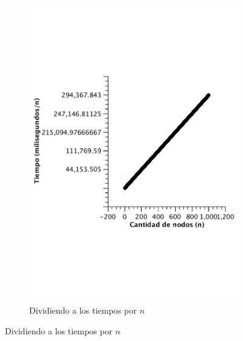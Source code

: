 \begin{figure}[H]
        \begin{subfigure}[b]{0.5\textwidth}
                \includegraphics[width=\textwidth]{imagenes/completo-listas-2.pdf}
                \caption{Dividiendo a los tiempos por $n$}
        \end{subfigure}


\end{figure}
